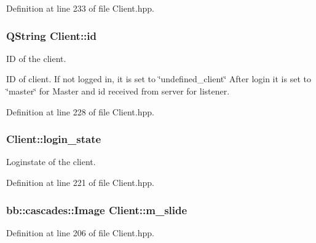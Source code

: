 Definition at line 233 of file Client.\+hpp.

\hypertarget{class_client_a87166760a487c87b749414f2d9ba1aa9}{}
\subsubsection[{id}]{\setlength{\rightskip}{0pt plus 5cm}Q\+String Client\+::id\hspace{0.3cm}{\ttfamily [protected]}}\label{class_client_a87166760a487c87b749414f2d9ba1aa9}


I\+D of the client. 

I\+D of client. If not logged in, it is set to \char`\"{}undefined\+\_\+client\char`\"{} After login it is set to \char`\"{}master\char`\"{} for Master and id received from server for listener. 

Definition at line 228 of file Client.\+hpp.

\hypertarget{class_client_a7bb4d5f91c7c9ac1564ac77caa95a64b}{}
\subsubsection[{login\+\_\+state}]{ Client\+::login\+\_\+state\hspace{0.3cm}{\ttfamily [protected]}}\label{class_client_a7bb4d5f91c7c9ac1564ac77caa95a64b}


Loginstate of the client. 



Definition at line 221 of file Client.\+hpp.

\hypertarget{class_client_a685777e360cd101ddcfeedfe13eac6bf}{}
\subsubsection[{m\+\_\+slide}]{\setlength{\rightskip}{0pt plus 5cm}bb\+::cascades\+::\+Image Client\+::m\+\_\+slide\hspace{0.3cm}{\ttfamily [protected]}}\label{class_client_a685777e360cd101ddcfeedfe13eac6bf}


Definition at line 206 of file Client.\+hpp.

\hypertarget{class_client_aae53be4d7e026f6de9416c85bf077384}{}
